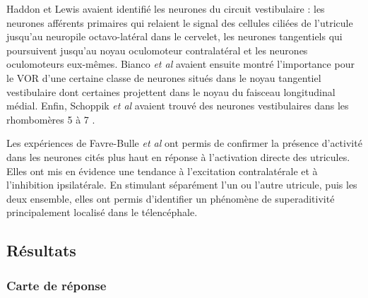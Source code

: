 Haddon et Lewis \cite{haddon_early_1996} avaient identifié les neurones du circuit vestibulaire : les neurones afférents primaires qui relaient le signal des cellules ciliées de l'utricule jusqu'au neuropile octavo-latéral dans le cervelet, les neurones tangentiels qui poursuivent jusqu'au noyau oculomoteur contralatéral et les neurones oculomoteurs eux-mêmes. Bianco \emph{et al} \cite{bianco_tangential_2012} avaient ensuite montré l'importance pour le VOR d'une certaine classe de neurones situés dans le noyau tangentiel vestibulaire dont certaines projettent dans le noyau du faisceau longitudinal médial. Enfin, Schoppik \emph{et al} avaient trouvé des neurones vestibulaires dans les rhombomères 5 à 7 \cite{schoppik_gaze-stabilizing_2017}.

Les expériences de Favre-Bulle \emph{et al} ont permis de confirmer la présence d'activité dans les neurones cités plus haut en réponse à l'activation directe des utricules. Elles ont mis en évidence une tendance à l'excitation contralatérale et à l'inhibition ipsilatérale. En stimulant séparément l'un ou l'autre utricule, puis les deux ensemble, elles ont permis d'identifier un phénomène de superaditivité principalement localisé dans le télencéphale.

\subsection{Résultats}

\subsubsection{Carte de réponse}

